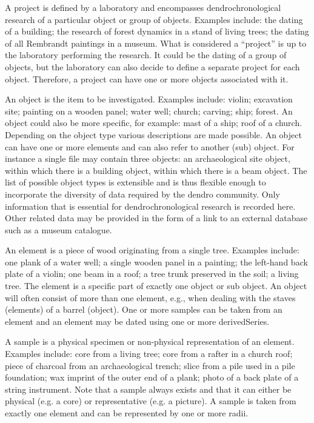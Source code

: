\documentclass[10pt, headsepline,DIV14,BCOR0.5cm]{scrreprt}
\begin{document}
\begin{description*}

\item{A project} is defined by a laboratory and encompasses dendrochronological research of a particular object or group of objects. Examples include: the dating of a building; the research of forest dynamics in a stand of living trees; the dating of all Rembrandt paintings in a museum. What is considered a “project” is up to the laboratory performing the research. It could be the dating of a group of objects, but the laboratory can also decide to define a separate project for each object. Therefore, a project can have one or more objects associated with it.

\item{An object} is the item to be investigated. Examples include: violin; excavation site; painting on a wooden panel; water well; church; carving; ship; forest. An object could also be more specific, for example: mast of a ship; roof of a church. Depending on the object type various descriptions are made possible. An object can have one or more elements and can also refer to another (sub) object. For instance a single file may contain three objects: an archaeological site object, within which there is a building object, within which there is a beam object. The list of possible object types is extensible and is thus flexible enough to incorporate the diversity of data required by the dendro community. Only information that is essential for dendrochronological research is recorded here. Other related data may be provided in the form of a link to an external database such as a museum catalogue.

\item{An element} is a piece of wood originating from a single tree. Examples include: one plank of a water well; a single wooden panel in a painting; the left-hand back plate of a violin; one beam in a roof; a tree trunk preserved in the soil; a living tree. The element is a specific part of exactly one object or sub object. An object will often consist of more than one element, e.g., when dealing with the staves (elements) of a barrel (object). One or more samples can be taken from an element and an element may be dated using one or more derivedSeries.

\item{A sample} is a physical specimen or non-physical representation of an element. Examples include: core from a living tree; core from a rafter in a church roof; piece of charcoal from an archaeological trench; slice from a pile used in a pile foundation; wax imprint of the outer end of a plank; photo of a back plate of a string instrument. Note that a sample always exists and that it can either be physical (e.g. a core) or representative (e.g. a picture). A sample is taken from exactly one element and can be represented by one or more radii.


\end{description*}
\end{document}
